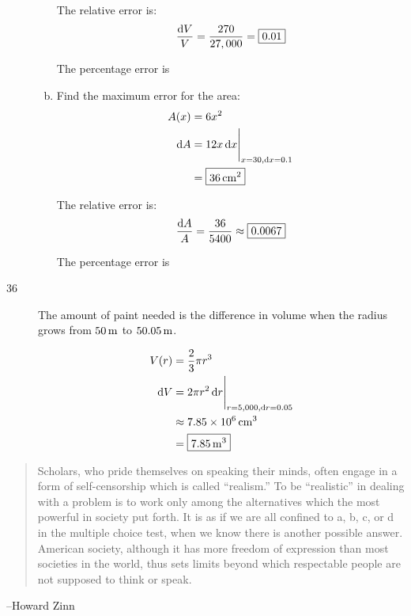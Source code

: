 \documentclass[letterpaper, landscape]{exam}
\newcommand{\dx}{\dif x}
\begin{document}
\begin{description}
\begin{enumerate}[(a)]
          The relative error is:
          \[
            \frac{\dif V}{V} = \frac{270}{27,000} = \boxed{ 0.01 } \\
          \]

          The percentage error is 

        \item 
          Find the maximum error for the area:
          \begin{align*}
            A(x)   & = 6x^2 \\
            \dif A & = \eval{ 12x \dx }_{x = 30, \dx = 0.1} \\
                   & = \boxed{ \unit[36]{cm^2} } \\
          \end{align*}

          The relative error is:
          \[
            \frac{\dif A}{A} = \frac{36}{5400} \approx \boxed{ 0.0067 } \\
          \]

          The percentage error is 

      \end{enumerate}

    \newpage

    \item[36]
      The amount of paint needed is the difference in volume when the radius grows from 
      $\unit[50]{m}$ to $\unit[50.05]{m}$.

      \begin{align*}
        V(r)   & = \frac{2}{3} \pi r^3 \\
        \dif V & = \eval{ 2 \pi r^2 \dif r }_{r = 5,000, \dif r = 0.05 } \\
               & \approx \unit[7.85 \times 10^6]{cm^3} \\
               & = \boxed{ \unit[7.85]{m^3} } \\
      \end{align*}

  \end{description}

  \else
    \vspace{9 cm}
    \begin{quote}
      \begin{em}
        Scholars, who pride themselves on speaking their minds, often engage in a form of
        self-censorship which is called ``realism.'' To be ``realistic'' in dealing with a problem
        is to work only among the alternatives which the most powerful in society put forth. It is
        as if we are all confined to a, b, c, or d in the multiple choice test, when we know there
        is another possible answer. American society, although it has more freedom of expression
        than most societies in the world, thus sets limits beyond which respectable people are not
        supposed to think or speak.
      \end{em}
    \end{quote}
    \hspace{2 cm} --Howard Zinn
  \fi
\end{document}
